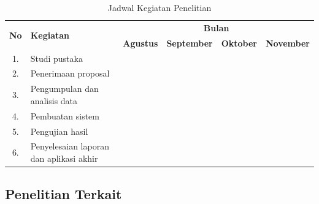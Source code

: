 \begin{enumerate}
    \begin{table}[htbp]
        \centering
        \setlength{\tabcolsep}{4pt}
        \renewcommand{\arraystretch}{1.2}
        \caption{Jadwal Kegiatan Penelitian}
        \label{tab:jadwal-penelitian}
        \begin{tabular}{|c|p{4cm}|c|c|c|c|}
        \hline
        \multirow{2}{*}{\textbf{No}} & \multirow{2}{*}{\textbf{Kegiatan}} & \multicolumn{4}{c|}{\textbf{Bulan}} \\
        \cline{3-6}
         & & \textbf{Agustus} & \textbf{September} & \textbf{Oktober} & \textbf{November} \\
        \hline
        1. & Studi pustaka & \cellcolor{lightgray} & & & \\
        \hline
        2. & Penerimaan proposal & \cellcolor{lightgray} & \cellcolor{lightgray} & & \\
        \hline
        3. & Pengumpulan dan analisis data & \cellcolor{lightgray} & \cellcolor{lightgray} & & \\
        \hline
        4. & Pembuatan sistem & & \cellcolor{lightgray} & \cellcolor{lightgray} & \\
        \hline
        5. & Pengujian hasil & & & \cellcolor{lightgray} & \\
        \hline
        6. & Penyelesaian laporan dan aplikasi akhir & & & \cellcolor{lightgray} & \cellcolor{lightgray} \\
        \hline
        \end{tabular}
    \end{table}
\end{enumerate}

\begin{landscape}
\section{Penelitian Terkait}
\mbox{} %
\end{landscape}
